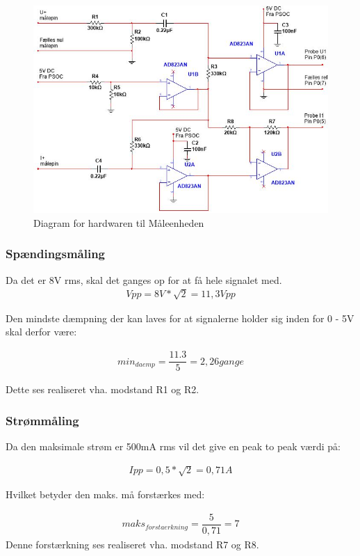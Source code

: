 \begin{figure}[htbp] %
	\centering
	\includegraphics[width=1\textwidth]{figure/MaalHardware}
	\caption{Diagram for hardwaren til Måleenheden}
	\label{fig:MaalHardware}
\end{figure} 


\subsubsection{Spændingsmåling}
Da det er 8V rms, skal det ganges op for at få hele signalet med.
\begin{align}
Vpp = 8V*\sqrt{2} = 11,3Vpp
\end{align}

Den mindste dæmpning der kan laves for at signalerne holder sig inden for 0 - 5V skal derfor være:

\begin{align}
min_{daemp} = \dfrac{11.3}{5} = 2,26 gange
\end{align}

Dette ses realiseret vha. modstand R1 og R2.

\subsubsection{Strømmåling}

Da  den maksimale strøm er 500mA rms vil det give en peak to peak værdi på:

\begin{align}
Ipp = 0,5*\sqrt{2} = 0,71A
\end{align}

Hvilket betyder den maks. må forstærkes med:

\begin{align}
maks_{forstaerkning} = \dfrac{5}{0,71} = 7
\end{align}
Denne forstærkning ses realiseret vha. modstand R7 og R8.  



 